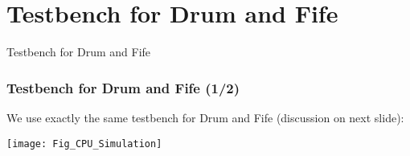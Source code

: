 
\section{Testbench for Drum and Fife}

\begin{frame}

\begin{center}
  {\LARGE Testbench for Drum and Fife}
\end{center}

\end{frame}


\begin{frame}[fragile]
\frametitle{Testbench for Drum and Fife (1/2)}

\footnotesize

We use exactly the same testbench for Drum and Fife (discussion on
next slide):

\vxx

\texttt{[image: Fig\_CPU\_Simulation]}

\end{frame}


